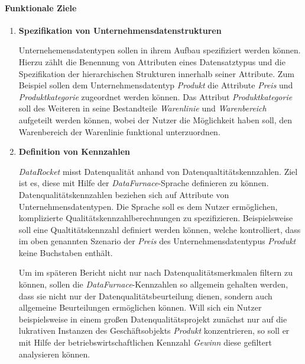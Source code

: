 \documentclass[
  language=german, %
  type=bachelor,%
  ngerman
]{isthesis}
\begin{document}
\begin{content}
  \paragraph{Funktionale Ziele}
    \begin{enumerate}
      \item \textbf{Spezifikation von Unternehmensdatenstrukturen}\label{item:spezifikation-von-unternehmensdatenstrukturen}

        Unternehemensdatentypen sollen in ihrem Aufbau spezifiziert werden
        können. Hierzu zählt die Benennung von Attributen eines Datensatztypus
        und die Spezifikation der hierarchischen Strukturen innerhalb seiner
        Attribute. Zum Beispiel sollen dem Unternehmensdatentyp \textit{Produkt}
        die Attribute \textit{Preis} und \textit{Produktkategorie} zugeordnet
        werden können. Das Attribut \textit{Produktkategorie} soll des Weiteren
        in seine Bestandteile \textit{Warenlinie} und \textit{Warenbereich}
        aufgeteilt werden können, wobei der Nutzer die Möglichkeit haben soll,
        den Warenbereich der Warenlinie funktional unterzuordnen.

        \newpage

      \item \textbf{Definition von Kennzahlen} 

        \textit{DataRocket} misst Datenqualität anhand von
        Datenqualtitätskennzahlen. Ziel ist es, diese mit Hilfe der
        \textit{DataFurnace}-Sprache definieren zu können.
        Datenqualitätskennzahlen beziehen sich auf Attribute von
        Unternehmensdatentypen. Die Sprache soll es dem Nutzer ermöglichen,
        komplizierte Qualitätskennzahlberechnungen zu spezifizieren. Beispielsweise
        soll eine Qualtitätskennzahl definiert werden können,
        welche kontrolliert, dass im oben genannten Szenario der \textit{Preis}
        des Unternehmensdatentypus \textit{Produkt} keine Buchstaben enthält.

        Um im späteren Bericht nicht nur nach Datenqualitätsmerkmalen filtern
        zu können, sollen die \textit{DataFurnace}-Kennzahlen so allgemein
        gehalten werden, dass sie nicht nur der Datenqualitätsbeurteilung
        dienen, sondern auch allgemeine Beurteilungen ermöglichen können. Will
        sich ein Nutzer beispielsweise in einem großen Datenqualitätsprojekt
        zunächst nur auf die lukrativen Instanzen des Geschäftsobjekts
        \textit{Produkt} konzentrieren, so soll er mit Hilfe der
        betriebswirtschaftlichen Kennzahl \textit{Gewinn} diese gefiltert
        analysieren können.
        

\end{enumerate}
\end{content}
\end{document}
